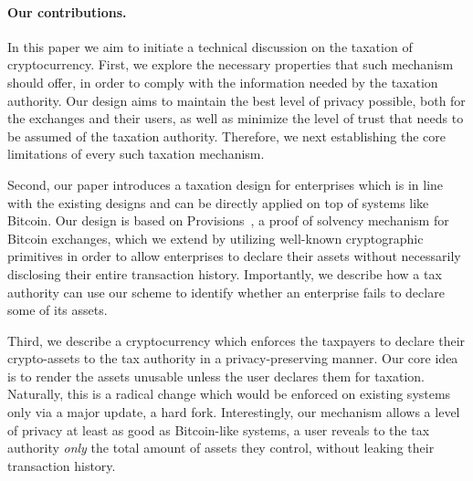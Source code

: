 \paragraph{Our contributions.}

In this paper we aim to initiate a technical discussion on the taxation of
cryptocurrency. First, we explore the necessary properties that such mechanism
should offer, in order to comply with the information needed by the taxation
authority. Our design aims to maintain the best level of privacy possible, both
for the exchanges and their users, as well as minimize the level of trust that
needs to be assumed of the taxation authority. Therefore, we next establishing
the core limitations of every such taxation mechanism.

Second, our paper introduces a taxation design for enterprises which is in line
with the existing designs and can be directly applied on top of systems like
Bitcoin. Our design is based on Provisions~\cite{CCS:DBBCB15}, a proof of
solvency mechanism for Bitcoin exchanges, which we extend by utilizing
well-known cryptographic primitives in order to allow enterprises to declare
their assets without necessarily disclosing their entire transaction history.
Importantly, we describe how a tax authority can use our scheme to identify
whether an enterprise fails to declare some of its assets.

Third, we describe a cryptocurrency which enforces the taxpayers to declare
their crypto-assets to the tax authority in a privacy-preserving manner. Our
core idea is to render the assets unusable unless the user declares them for
taxation. Naturally, this is a radical change which would be enforced on
existing systems only via a major update, \ie a hard fork. Interestingly, our
mechanism allows a level of privacy at least as good as Bitcoin-like systems,
\ie a user reveals to the tax authority \emph{only} the total amount of assets
they control, without leaking their transaction history.
